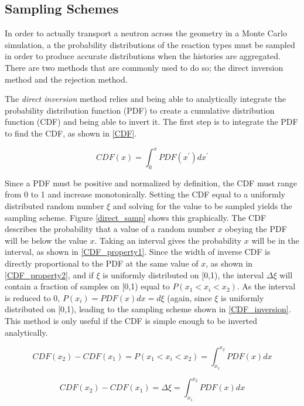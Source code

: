 \subsection{Sampling Schemes}

In order to actually transport a neutron across the geometry in a Monte Carlo simulation, a the probability distributions of the reaction types must be sampled in order to produce accurate distributions when the histories are aggregated.  There are two methods that are commonly used to do so; the direct inversion method and the rejection method.  

The \emph{direct inversion} method relies and being able to analytically integrate the probability distribution function (PDF) to create a cumulative distribution function (CDF) and being able to invert it.  The first step is to integrate the PDF to find the CDF, as shown in \eqref{CDF}.

\begin{equation}
\label{CDF}
CDF(x) = \int_0^x PDF(x^\prime) dx^\prime
\end{equation}

Since a PDF must be positive and normalized by definition, the CDF must range from 0 to 1 and increase monotonically.  Setting the CDF equal to a uniformly distributed random number $\xi$ and solving for the value to be sampled yields the sampling scheme.  Figure \ref{direct_samp} shows this graphically.  The CDF describes the probability that a value of a random number $x$ obeying the PDF will be below the value $x$.  Taking an interval gives the probability $x$ will be in the interval, as shown in \eqref{CDF_property1}.  Since the width of inverse CDF is directly proportional to the PDF at the same value of $x$, as shown in \eqref{CDF_property2}, and if $\xi$ is uniformly distributed on [0,1), the interval $\Delta \xi$ will contain a fraction of samples on [0,1) equal to $P( x_1 < x_i < x_2)$.  As the interval is reduced to 0, $P(x_i)= PDF(x)dx = d\xi$ (again, since $\xi$ is uniformly distributed on [0,1), leading to the sampling scheme shown in \eqref{CDF_inversion}.  This method is only useful if the CDF is simple enough to be inverted analytically.

\begin{equation}
\label{CDF_property1}
CDF(x_2) - CDF(x_1) = P( x_1 < x_i < x_2) = \int_{x_1}^{x_2} PDF(x) dx
\end{equation}

\begin{equation}
\label{CDF_property2}
CDF(x_2) - CDF(x_1) = \Delta \xi =  \int_{x_1}^{x_2} PDF(x) dx
\end{equation}

